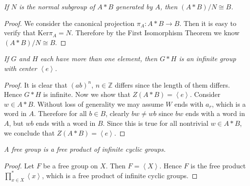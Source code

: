 \begin{problem}\em
If $N$ is the normal subgroup of $A*B$ generated by $A$, then $(A*B)/N\cong B$.
\end{problem}
\begin{proof}
We consider the canonical projection $\pi_A:A*B\to B$. Then it is easy to verify that $\mathrm{Ker}\pi_A=N$. Therefore by the First Isomorphism Theorem we know $(A*B)/N\cong B$.
\end{proof}
\begin{problem}\em
If $G$ and $H$ each have more than one element, then $G*H$ is an infinite group with center $\left<e\right>$.
\end{problem}
\begin{proof}
It is clear that $(ab)^n$, $n\in\mathbb{Z}$ differs since the length of them differs. Hence $G*H$ is infinite. Now we show that $Z(A*B)=\left<e\right>$. Consider $w\in A*B$. Without loss of generality we may assume $W$ ends with $a_r$, which is a word in $A$. Therefore for all $b\in B$, clearly $bw\ne wb$ since $bw$ ends with a word in $A$, but $wb$ ends with a word in $B$. Since this is true for all nontrivial $w\in A*B$, we conclude that $Z(A*B)=\left<e\right>$.
\end{proof}
\begin{problem}\em
A free group is a free product of infinite cyclic groups.
\end{problem}
\begin{proof}
Let $F$ be a free group on $X$. Then $F=\left<X\right>$. Hence $F$ is the free product ${\prod}^*_{x\in X}\left<x\right>$, which is a free product of infinite cyclic groups.
\end{proof}